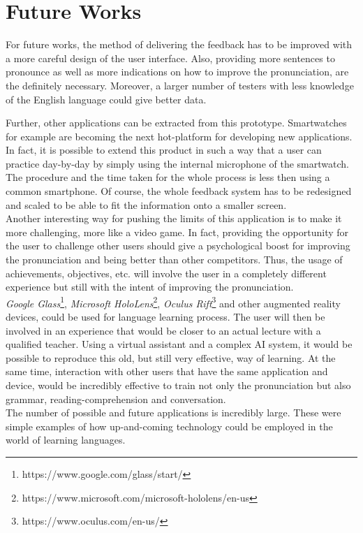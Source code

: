 
\chapter{Future Works}
\label{ch:Future Works}

For future works, the method of delivering the feedback has to be improved with a more careful design of the user interface. Also, providing more sentences to pronounce as well as more indications on how to improve the pronunciation, are the definitely necessary. Moreover, a larger number of testers with less knowledge of the English language could give better data.

Further, other applications can be extracted from this prototype. Smartwatches for example are becoming the next hot-platform for developing new applications. In fact, it is possible to extend this product in such a way that a user can practice day-by-day by simply using the internal microphone of the smartwatch. The procedure and the time taken for the whole process is less then using a common smartphone. Of course, the whole feedback system has to be redesigned and scaled to be able to fit the information onto a smaller screen. \\

\noindent Another interesting way for pushing the limits of this application is to make it more challenging, more like a video game. In fact, providing the opportunity for the user to challenge other users should give a psychological boost for improving the pronunciation and being better than other competitors. Thus, the usage of achievements, objectives, etc. will involve the user in a completely different experience but still with the intent of improving the pronunciation. \\

\noindent \textit{Google Glass}\footnote{https://www.google.com/glass/start/}, \textit{Microsoft HoloLens}\footnote{https://www.microsoft.com/microsoft-hololens/en-us}, \textit{Oculus Rift}\footnote{https://www.oculus.com/en-us/} and other augmented reality devices, could be used for language learning process. The user will then be involved in an experience that would be closer to an actual lecture with a qualified teacher. Using a virtual assistant and a complex AI system, it would be possible to reproduce this old, but still very effective, way of learning. At the same time, interaction with other users that have the same application and device, would be incredibly effective to train not only the pronunciation but also grammar, reading-comprehension and conversation. \\

\noindent The number of possible and future applications is incredibly large. These were simple examples of how up-and-coming technology could be employed in the world of learning languages.

